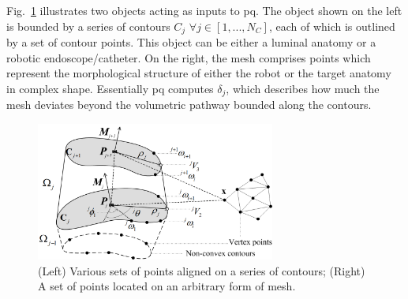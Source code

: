 Fig.~\ref{fig:pqa} illustrates two objects acting as inputs to \gls{pq}. 
The object shown on the left is bounded by a series of contours $C_j$ $\forall j \in [1,...,N_C]$, each of which is outlined by a set of contour points. 
This object can be either a luminal anatomy or a robotic endoscope/catheter. 
On the right, the mesh comprises points which represent the morphological structure of either the robot or the target anatomy in complex shape. 
Essentially \gls{pq} computes $\delta_j$, which describes how much the mesh deviates beyond the volumetric pathway bounded along the contours.

\begin{figure}[ht]
\begin{center}
\includegraphics[width=0.7\textwidth]{3_precision/figures/pqa}
\end{center}
\caption[Various sets of points aligned on a series of contours; A set of points located on an arbitrary form of mesh.]{(Left) Various sets of points aligned on a series of contours; 
(Right) A set of points located on an arbitrary form of mesh.}
\label{fig:pqa}
\end{figure}

